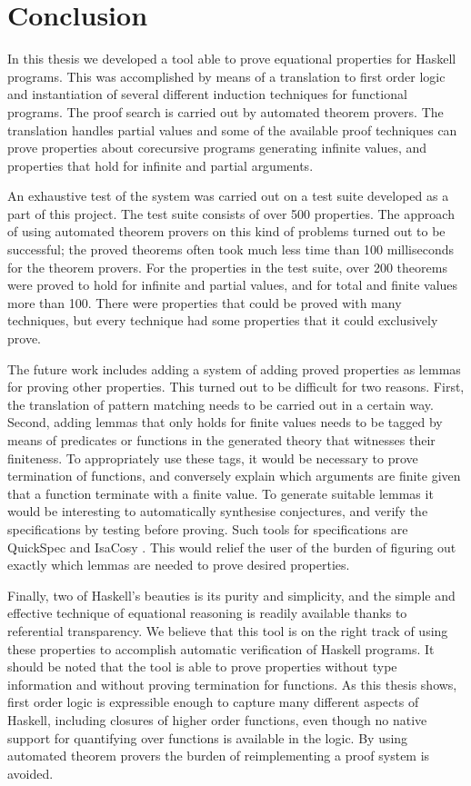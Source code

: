 \chapter{Conclusion}
\label{ch:conclusion}

In this thesis we developed a tool able to prove equational properties
for Haskell programs. This was accomplished by means of a translation
to first order logic and instantiation of several different induction
techniques for functional programs. The proof search is carried out by
automated theorem provers. The translation handles partial values and
some of the available proof techniques can prove properties about
corecursive programs generating infinite values, and properties that
hold for infinite and partial arguments.

An exhaustive test of the system was carried out on a test suite
developed as a part of this project. The test suite consists of over
500 properties. %
The approach of using automated theorem provers on
this kind of problems turned out to be successful; the proved theorems
often took much less time than 100 milliseconds for the theorem
provers. For the properties in the test suite, over 200 theorems were
proved to hold for infinite and partial values, and for total and
finite values more than 100. There were properties that could be
proved with many techniques, but every technique had some properties
that it could exclusively prove.

The future work includes adding a system of adding proved properties
as lemmas for proving other properties. This turned out to be
difficult for two reasons. First, the translation of pattern matching
needs to be carried out in a certain way. Second, adding lemmas that
only holds for finite values needs to be tagged by means of predicates
or functions in the generated theory that witnesses their
finiteness. To appropriately use these tags, it would be necessary to
prove termination of functions, and conversely explain which arguments
are finite given that a function terminate with a finite value.
To generate suitable lemmas it would be interesting to automatically
synthesise conjectures, and verify the specifications by testing
before proving. Such tools for specifications are QuickSpec
\citep{quickspec} and IsaCosy \citep{isacosy}. This would relief the
user of the burden of figuring out exactly which lemmas are needed to
prove desired properties.

Finally, two of Haskell's beauties is its purity and simplicity, and
the simple and effective technique of equational reasoning is readily
available thanks to referential transparency. We believe that this
tool is on the right track of using these properties to accomplish
automatic verification of Haskell programs.  It should be noted that
the tool is able to prove properties without type information and
without proving termination for functions.  As this thesis shows,
first order logic is expressible enough to capture many different
aspects of Haskell, including closures of higher order functions, even
though no native support for quantifying over functions is available
in the logic. By using automated theorem provers the
burden of reimplementing a proof system is avoided.

